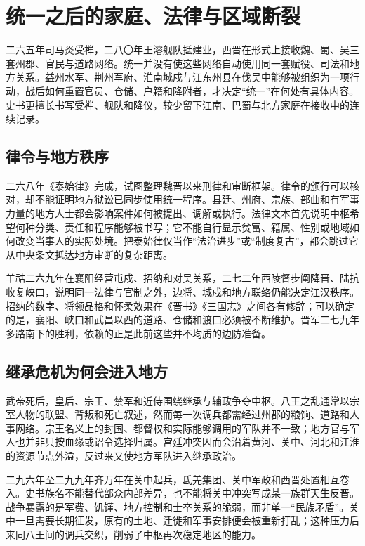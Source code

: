 \section{统一之后的家庭、法律与区域断裂}
\label{sec:western-jin-households-law-regions}

二六五年司马炎受禅，二八〇年王濬舰队抵建业，西晋在形式上接收魏、蜀、吴三套州郡、官民与道路网络。统一并没有使这些网络自动使用同一套赋役、司法和地方关系。益州水军、荆州军府、淮南城戍与江东州县在伐吴中能够被组织为一项行动，战后如何重置官员、仓储、户籍和降附者，才决定“统一”在何处有具体内容。史书更擅长书写受禅、舰队和降仪，较少留下江南、巴蜀与北方家庭在接收中的连续记录。

\subsection{律令与地方秩序}

二六八年《泰始律》完成，试图整理魏晋以来刑律和审断框架。律令的颁行可以核对，却不能证明地方狱讼已同步使用统一程序。县廷、州府、宗族、部曲和有军事力量的地方人士都会影响案件如何被提出、调解或执行。法律文本首先说明中枢希望何种分类、责任和程序能够被书写；它不能自行显示贫富、籍属、性别或地域如何改变当事人的实际处境。把泰始律仅当作“法治进步”或“制度复古”，都会跳过它从中央条文抵达地方审断的复杂距离。

羊祜二六九年在襄阳经营屯戍、招纳和对吴关系，二七二年西陵督步阐降晋、陆抗收复峡口，说明同一法律与官制之外，边将、城戍和地方联络仍能决定江汉秩序。招纳的数字、将领品格和怀柔效果在《晋书》《三国志》之间各有修辞；可以确定的是，襄阳、峡口和武昌以西的道路、仓储和渡口必须被不断维护。晋军二七九年多路南下的胜利，依赖的正是此前这些并不均质的边防准备。

\subsection{继承危机为何会进入地方}

武帝死后，皇后、宗王、禁军和近侍围绕继承与辅政争夺中枢。八王之乱通常以宗室人物的联盟、背叛和死亡叙述，然而每一次调兵都需经过州郡的粮饷、道路和人事网络。宗王名义上的封国、都督权和实际能够调用的军队并不一致；地方官与军人也并非只按血缘或诏令选择归属。宫廷冲突因而会沿着黄河、关中、河北和江淮的资源节点外溢，反过来又使地方军队进入继承政治。

二九六年至二九九年齐万年在关中起兵，氐羌集团、关中军政和西晋处置相互卷入。史书族名不能替代部众内部差异，也不能将关中冲突写成某一族群天生反晋。战争暴露的是军费、饥馑、地方控制和士卒关系的脆弱，而非单一“民族矛盾”。关中一旦需要长期征发，原有的土地、迁徙和军事安排便会被重新打乱；这种压力后来同八王间的调兵交织，削弱了中枢再次稳定地区的能力。

